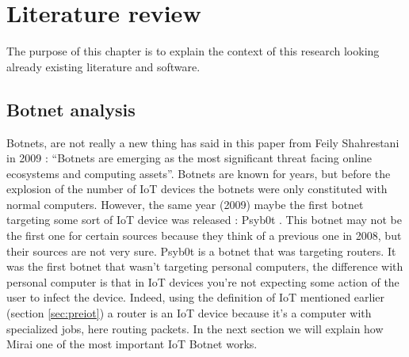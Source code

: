 \documentclass{report}
\begin{document}
\chapter{Literature review}
The purpose of this chapter is to explain the context of this research looking already existing literature and software.\newline
\newline

\section{Botnet analysis}
Botnets, are not really a new thing has said in this paper from Feily Shahrestani in 2009 \autocite{feily2009survey} : ``Botnets are emerging as the most significant threat facing online ecosystems and computing assets''. Botnets are known for years, but before the explosion of the number of IoT devices the botnets were only constituted with normal computers. However, the same year (2009) maybe the first botnet targeting some sort of IoT device was released : Psyb0t \autocite{durfina2013psybot}. This botnet may not be the first one for certain sources \autocite{angrishi2017turning} because they think of a previous one in 2008, but their sources are not very sure. Psyb0t is a botnet that was targeting routers. It was the first botnet that wasn't targeting personal computers, the difference with personal computer is that in IoT devices you're not expecting some action of the user to infect the device. Indeed, using the definition of IoT mentioned earlier (section \ref{sec:preiot}) a router is an IoT device because it's a computer with specialized jobs, here routing packets.\newline
In the next section we will explain how Mirai one of the most important IoT Botnet works.
\end{document}
